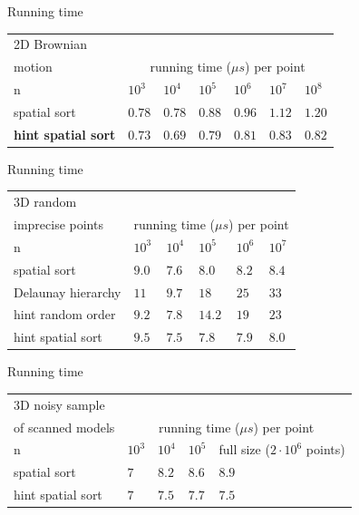 \documentclass{beamer}
\begin{document}
\begin{frame}{Running time}
\begin{tabular}{|l||l|l|l|l|l|l|}
\hline
2D Brownian \\
motion & \multicolumn{6}{|c|}{running time  ($\mu s$) per point}\\
 \hline \hline
    n & $10^3$ & $10^4$ & $10^5$ & $10^6$ & $10^7$ & $10^8$ \\\hline
    spatial sort & $0.78$ & $0.78 $ & $0.88 $ & $0.96 $ & $1.12 $ & $1.20$\\\hline
    \textbf{hint spatial sort} & $0.73 $ & $0.69$ & $0.79$ & $0.81 $ & $0.83 $ & $0.82$\\
    \hline
\end{tabular}
\end{frame}

\begin{frame}{Running time}
\begin{tabular}{|l||l|l|l|l|l|}
\hline
3D random \\
imprecise points & \multicolumn{5}{|c|}{running time  ($\mu s$) per point}\\
 \hline \hline
    n & $10^3$ & $10^4$ & $10^5$ & $10^6$ & $10^7$ \\\hline
    spatial sort & $9.0$ & $7.6 $ & $8.0$ & $8.2$ & $8.4$\\\hline
    Delaunay hierarchy & $11$ & $9.7$ & $18$ & $25$ & $33$\\\hline
    hint random order & $9.2 $ & $7.8 $ & $14.2 $ & $19 $ & $23$ \\\hline
    hint spatial sort & $9.5$ & $7.5$ & $7.8$ & $7.9$ & $8.0$\\\hline
\end{tabular}
\end{frame}

\begin{frame}{Running time}
\begin{tabular}{|l||l|l|l|l|}
\hline
3D noisy sample \\
of scanned models& \multicolumn{4}{|c|}{running time  ($\mu s$) per point}\\
 \hline \hline
    n & $10^3$ & $10^4$ & $10^5$ & full size ($2 \cdot 10^6$ points)\\\hline
    spatial sort & $7$ & $8.2$ & $8.6$ & $8.9$\\\hline
    hint spatial sort & $7$ & $7.5$ & $7.7$ & $7.5$\\\hline
\end{tabular}
\end{frame}
\end{document}
